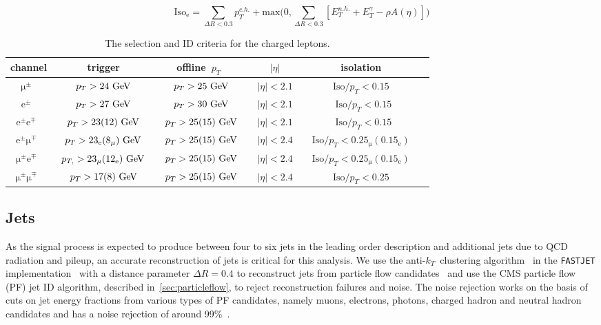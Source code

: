 \begin{equation}
\label{eq:iso_el}
\mathrm{Iso}_{\mathrm{e}} = \sum_{\Delta R < 0.3} p_T^{c.h.} + \mathrm{max}\biggl(0, \sum_{\Delta R < 0.3} [E_T^{n.h.} + E_T^{\gamma} - \rho A(\eta)] \biggr)
\end{equation}

\begin{table}[h!]
\begin{center}
\label{tab:lepton_selection}
\begin{tabular}{c|ccccc}
\hline
channel & trigger & offline~$p_T$~&~$|\eta|$~& isolation \\
\hline
$\mathrm{\mu}^\pm$~&~$p_T > 24~\mathrm{GeV}$~&~$p_T > 25~\mathrm{GeV}$~&~$|\eta| < 2.1$~& ~$\mathrm{Iso}/p_T < 0.15$~\\

$\mathrm{e}^\pm$~&~$p_T > 27~\mathrm{GeV}$~&~$p_T > 30~\mathrm{GeV}$~&~$|\eta| < 2.1$~&~$\mathrm{Iso}/p_T < 0.15$\\

$\mathrm{e}^\pm\mathrm{e}^\mp$~&~$p_T > 23 (12)~\mathrm{GeV}$~&~$p_T > 25 (15)~\mathrm{GeV}$~&~$|\eta| < 2.1$~&~$\mathrm{Iso}/p_T < 0.15$\\

$\mathrm{e}^\pm\mathrm{\mu}^\mp$~&~$p_{T} > 23_{\mathrm{e}} (8_{\mathrm{\mu}})~\mathrm{GeV}$~&~$p_T > 25 (15)~\mathrm{GeV}$~&~$|\eta| < 2.4$~&~$\mathrm{Iso}/p_T < 0.25_{\mathrm{\mu}} (0.15_{\mathrm{e}})$~\\

$\mathrm{\mu}^\pm\mathrm{e}^\mp$~&~$p_{T,} > 23_{\mathrm{\mu}} (12_{\mathrm{e}})~\mathrm{GeV}$~&~$p_T > 25 (15)~\mathrm{GeV}$~&~$|\eta| < 2.4$~&~$\mathrm{Iso}/p_T < 0.25_{\mathrm{\mu}} (0.15_{\mathrm{e}})$~\\

$\mathrm{\mu}^\pm\mathrm{\mu}^\mp$~&~$p_T > 17 (8)~\mathrm{GeV}$~&~$p_T > 25 (15)~\mathrm{GeV}$~&~$|\eta| < 2.4$~&~$\mathrm{Iso}/p_T < 0.25$~\\

\hline
\hline
\end{tabular}
\caption{The selection and ID criteria for the charged leptons.}
\end{center}
\end{table}

\subsection{Jets}
\label{sec:object_id_jets}
As the signal process is expected to produce between four to six jets in the leading order description and additional jets due to QCD radiation and pileup, an accurate reconstruction of jets is critical for this analysis. We use the anti-$k_T$~clustering algorithm~\cite{Cacciari:2008gp} in the \texttt{FASTJET} implementation~\cite{Cacciari:2011ma} with a distance parameter $\Delta R=0.4$ to reconstruct jets from particle flow candidates~\cite{CMS:2010xta,CMS:2009nxa,CMS:2010byl} and use the CMS particle flow (PF) jet ID algorithm, described in~\cref{sec:particleflow}, to reject reconstruction failures and noise. The noise rejection works on the basis of cuts on jet energy fractions from various types of PF candidates, namely muons, electrons, photons, charged hadron and neutral hadron candidates and has a noise rejection of around 99\%~\cite{CMS:2017wyc}.

